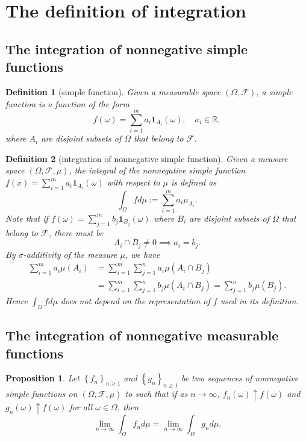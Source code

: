 \documentclass{report}
\newtheorem{definition}{Definition}[section]
\newtheorem{proposition}{Proposition}[section]
\theoremstyle{nonumberplain}
\begin{document}
\section{The definition of integration}
\subsection{The integration of nonnegative simple functions}
\begin{definition}[simple function]
	Given a measurable space $(\Omega, \mathcal{F})$, a simple function is a function of the form
	\[
	f(\omega)=\sum_{i=1}^ma_i\mathbf{1}_{A_i}(\omega),\quad a_i\in\mathbb{R},
	\]
	where $A_i$ are disjoint subsets
	of $\Omega$ that belong to $\mathcal{F}$.
\end{definition}

\begin{definition}[integration of nonnegative simple function]
	Given a measure space $(\Omega, \mathcal{F},\mu)$, the integral of the nonnegative simple function $f(x)=\sum_{i=1}^ma_i\mathbf{1}_{A_i}(\omega)$ with respect to $\mu$
	is defined as
	\[
	\int_\Omega fd\mu:=\sum_{i=1}^ma_i\mu_{A_i}.
	\]
	Note that if $f(\omega)=\sum_{j=1}^mb_j\mathbf{1}_{B_j}(\omega)$ where $B_i$ are disjoint subsets
	of $\Omega$ that belong to $\mathcal{F}$, there must be
	\[
	A_{i} \cap B_{j} \neq 0\implies a_{i}=b_{j}.
	\]
	By $\sigma$-additivity of the measure $\mu$, we have
	\[
	\begin{aligned}
		\sum_{i=1}^{m} a_{i} \mu\left(A_{i}\right) &=\sum_{i=1}^{m} \sum_{j=1}^{n} a_{i} \mu\left(A_{i} \cap B_{j}\right) \\
		&=\sum_{i=1}^{m} \sum_{j=1}^{n} b_{j} \mu\left(A_{i} \cap B_{j}\right)=\sum_{j=1}^{n} b_{j} \mu\left(B_{j}\right).
	\end{aligned}
	\]
	Hence $\int_\Omega fd\mu$ does not depend on the representation of $f$ used in its definition.
\end{definition}
\subsection{The integration of nonnegative measurable functions}
\begin{proposition}
	Let $\left\{f_{n}\right\}_{n \ge 1}$ and $\left\{g_{n}\right\}_{n \ge 1}$ be two sequences of nonnegative simple functions on $(\Omega, \mathcal{F}, \mu)$ to such that if as $n \rightarrow \infty$, $f_{n}(\omega) \uparrow f(\omega)$ and $g_{n}(\omega) \uparrow f(\omega)$ for all $\omega \in \Omega$, then
	\[
	\lim_{n \rightarrow \infty} \int_\Omega f_{n} d \mu=\lim _{n \rightarrow \infty} \int_\Omega g_{n} d \mu.
	\]
\end{proposition}
\end{document}
